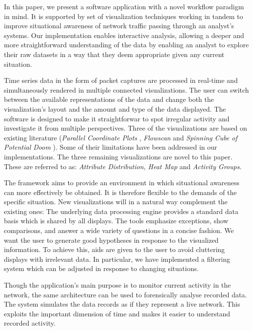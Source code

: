 In this paper, we present a software application with a novel workflow paradigm in mind. It is
supported by set of visualization techniques working in tandem to improve situational awareness of
network traffic passing through an analyst's systems. Our implementation enables interactive
analysis, allowing a deeper and more straightforward understanding of the data by enabling an
analyst to explore their raw datasets in a way that they deem appropriate given any current
situation.
 
Time series data in the form of packet captures are processed in real-time and simultaneously
rendered in multiple connected visualizations. The user can switch between the available
representations of the data and change both the visualization's layout and the amount and type of
the data displayed. The software is designed to make it straightforwar to spot irregular activity
and investigate it from multiple perspectives. Three of the visualizations are based on existing
literature (\textit{Parallel Coordinate Plots} \cite{inselberg1985plane}, \textit{Flowscan}
\cite{plonka2000flowscan} and \textit{Spinning Cube of Potential Doom} \cite{lau2004spinning}). Some
of their limitations have been addressed in our implementations. The three remaining visualizations
are novel to this paper. These are referred to as: \textit{Attribute Distribution, Heat Map} and
\textit{Activity Groups}.

The framework aims to provide an environment in which situational awareness can more effectively be
obtained. It is therefore flexible to the demands of the specific situation. New visualizations will
in a natural way complement the existing ones: The underlying data processing engine provides a
standard data basis which is shared by all displays. The tools emphasize exceptions, show
comparisons, and answer a wide variety of questions in a concise fashion. We want the user to
generate good hypotheses in response to the visualized information. To achieve this, aids are given
to the user to avoid cluttering displays with irrelevant data. In particular, we have implemented a
filtering system which can be adjusted in response to changing situations.

Though the application's main purpose is to monitor current activity in the network, the same
architecture can be used to forensically analyse recorded data. The system simulates the data
records as if they represent a live network. This exploits the important dimension of time and makes
it easier to understand recorded activity.

